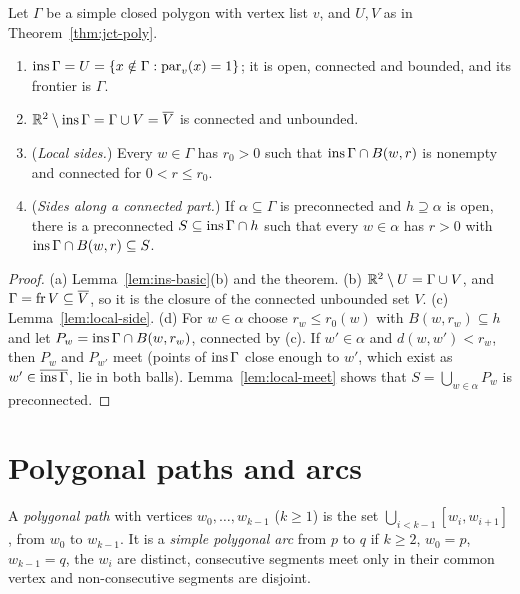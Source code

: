 \begin{corollary}\label{cor:jct-consequences}
Let $\Gamma$ be a simple closed polygon with vertex list $v$, and $U,V$ as in
Theorem~\ref{thm:jct-poly}.
\begin{enumerate}[label=(\alph*)]
\item $\operatorname{ins}\Gamma=U=\left\{ x\notin\Gamma:\operatorname{par}_v(x)=1 \right\}$; it is open, connected and bounded, and its
frontier is $\Gamma$.
\item $\mathbb{R}^2\setminus\operatorname{ins}\Gamma=\Gamma\cup V=\overline{V}$ is connected and unbounded.
\item (\emph{Local sides.}) Every $w\in\Gamma$ has $r_0>0$ such that $\operatorname{ins}\Gamma\cap B(w,r)$ is
nonempty and connected for $0<r\le r_0$.
\item (\emph{Sides along a connected part.}) If $\alpha\subseteq\Gamma$ is preconnected and
$h\supseteq\alpha$ is open, there is a preconnected $S\subseteq\operatorname{ins}\Gamma\cap h$ such that every
$w\in\alpha$ has $r>0$ with $\operatorname{ins}\Gamma\cap B(w,r)\subseteq S$.
\end{enumerate}
\end{corollary}

\begin{proof}
(a) Lemma~\ref{lem:ins-basic}(b) and the theorem. (b) $\mathbb{R}^2\setminus U=\Gamma\cup V$, and
$\Gamma=\operatorname{fr}V\subseteq\overline{V}$, so it is the closure of the connected unbounded set $V$.
(c) Lemma~\ref{lem:local-side}. (d) For $w\in\alpha$ choose $r_w\le r_0(w)$ with $B(w,r_w)\subseteq h$
and let $P_w=\operatorname{ins}\Gamma\cap B(w,r_w)$, connected by (c). If $w'\in\alpha$ and $d(w,w')<r_w$, then
$P_w$ and $P_{w'}$ meet (points of $\operatorname{ins}\Gamma$ close enough to $w'$, which exist as
$w'\in\overline{\operatorname{ins}\Gamma}$, lie in both balls). Lemma~\ref{lem:local-meet} shows that
$S=\bigcup_{w\in\alpha}P_w$ is preconnected.
\end{proof}


\section{Polygonal paths and arcs}

\begin{definition}\label{def:polypath}
A \emph{polygonal path} with vertices $w_0,\dots,w_{k-1}$ ($k\ge1$) is the set
$\bigcup_{i<k-1}[w_i,w_{i+1}]$, from $w_0$ to $w_{k-1}$. It is a \emph{simple polygonal arc} from $p$
to $q$ if $k\ge2$, $w_0=p$, $w_{k-1}=q$, the $w_i$ are distinct, consecutive segments meet only in
their common vertex and non-consecutive segments are disjoint.
\end{definition}

